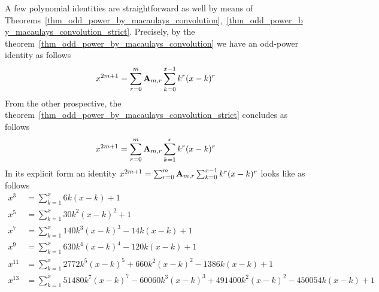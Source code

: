 A few polynomial identities are straightforward as well by means of
Theorems~\ref{thm_odd_power_by_macaulays_convolution},~\ref{thm_odd_power_by_macaulays_convolution_strict}.
Precisely, by the theorem~\ref{thm_odd_power_by_macaulays_convolution} we have an odd-power identity as follows
\begin{equation*}
    x^{2m+1} = \sum_{r=0}^{m} {\mathbf{A}} \sb{m,r} \sum_{k=0}^{x-1} k^r (x-k)^r
\end{equation*}
From the other prospective, the theorem~\ref{thm_odd_power_by_macaulays_convolution_strict} concludes as follows
\begin{equation*}
    x^{2m+1} = \sum_{r=0}^{m} {\mathbf{A}} \sb{m,r} \sum_{k=1}^{x} k^r (x-k)^r
\end{equation*}
In its explicit form an identity $x^{2m+1} = \sum_{r=0}^{m} {\mathbf{A}} \sb{m,r} \sum_{k=0}^{x-1} k^r (x-k)^r$ looks like
as follows
\begin{align*}
    x^3 &= \sum_{k=1}^{x} 6k (x-k) + 1 \\
    x^5 &= \sum_{k=1}^{x} 30k^2 (x-k)^2 + 1 \\
    x^7 &= \sum_{k=1}^{x} 140 k^3 (x-k)^3 - 14k(x-k) + 1 \\
    x^9 &= \sum_{k=1}^{x} 630 k^4(x-k)^4 - 120k(x-k) + 1 \\
    x^{11} &= \sum_{k=1}^{x} 2772 k^5 (x-k)^5 + 660 k^2(x-k)^2 - 1386k(x-k) + 1 \\
    x^{13} &= \sum_{k=1}^{x} 51480 k^7 (x-k)^7 - 60060 k^3 (x-k)^3 + 491400 k^2 (x-k)^{2} - 450054 k (x-k) + 1 \\
\end{align*}
